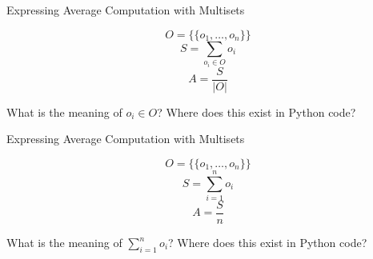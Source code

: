 \documentclass[14pt,aspectratio=169]{beamer}
\begin{document}
%
\begin{frame}{Expressing Average Computation with Multisets}
  \vspace*{-.5in}
  \begin{center}
  \fontsize{20}{30}\selectfont
    \begin{equation*}
     O = \{\!\{o_1, \ldots, o_n\}\!\}
    \end{equation*}
    \begin{equation*}
      S = \sum_{o_i \in O} o_i
    \end{equation*}
    \begin{equation*}
      A = \frac{S}{|O|}
    \end{equation*}
  \end{center}
  \vspace{2ex}
  \begin{center}
    \small What is the meaning of $o_i \in O$? Where does this exist in Python code?
  \end{center}
\end{frame}

%
\begin{frame}{Expressing Average Computation with Multisets}
  \vspace*{-.5in}
  \begin{center}
  \fontsize{20}{30}\selectfont
    \begin{equation*}
     O = \{\!\{o_1, \ldots, o_n\}\!\}
    \end{equation*}
    \begin{equation*}
      S = \sum_{i=1}^{n} o_i
    \end{equation*}
    \begin{equation*}
      A = \frac{S}{n}
    \end{equation*}
  \end{center}
  \vspace{2ex}
  \begin{center}
    \small What is the meaning of $\sum_{i=1}^{n} o_i$? Where does this exist in Python code?
  \end{center}
\end{frame}
\end{document}
